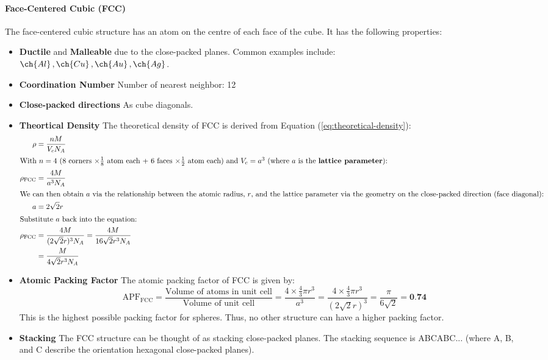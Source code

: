 \documentclass[11pt]{article}
\begin{document}
\paragraph{Face-Centered Cubic (FCC)} The face-centered cubic structure has an atom on the centre of each face of the cube. It has the following properties:
\begin{itemize}
    \item \textbf{Ductile} and \textbf{Malleable} due to the close-packed planes. Common examples include: \\ $\ch{Al}\, ,\ch{Cu}\, ,\ch{Au}\, ,\ch{Ag}$.
    \item \textbf{Coordination Number} Number of nearest neighbor: 12
    \item \textbf{Close-packed directions} As cube diagonals.
    \item \textbf{Theortical Density} The theoretical density of FCC is derived from Equation (\ref{eq:theoretical-density}):
    \begin{align}
        \rho &= \frac{nM}{V_c N_A} \nonumber \\
        \intertext{With $n = 4$ (8 corners $\times \frac{1}{8}$ atom each + 6 faces $\times \frac{1}{2}$ atom each) and $V_c = a^3$ (where $a$ is the \textbf{lattice parameter}):}
        \rho_\text{FCC} &= \frac{4M}{a^3 N_A} \nonumber \\
        \intertext{We can then obtain $a$ via the relationship between the atomic radius, $r$, and the lattice parameter via the geometry on the close-packed direction (face diagonal):}
        a &= 2\sqrt{2}r \nonumber \\
        \intertext{Substitute $a$ back into the equation:}
        \rho_\text{FCC} &= \frac{4M}{(2\sqrt{2}r)^3 N_A} = \frac{4M}{16\sqrt{2}r^3 N_A} \nonumber \\
        &= \frac{M}{4\sqrt{2}r^3 N_A} 
    \end{align}
    \item \textbf{Atomic Packing Factor} The atomic packing factor of FCC is given by:
    \begin{equation}
        \text{APF}_\text{FCC} = \frac{\text{Volume of atoms in unit cell}}{\text{Volume of unit cell} } = \frac{4 \times \frac{4}{3}\pi r^3}{a^3} = \frac{4 \times \frac{4}{3}\pi r^3}{(2\sqrt{2}r)^3} = \frac{\pi}{6\sqrt{2}} = \textbf{0.74}
    \end{equation}
    This is the highest possible packing factor for spheres. Thus, no other structure can have a higher packing factor.
    \item \textbf{Stacking} The FCC structure can be thought of as stacking close-packed planes. The stacking sequence is ABCABC... (where A, B, and C describe the orientation hexagonal close-packed planes).
\end{itemize}
\end{document}
